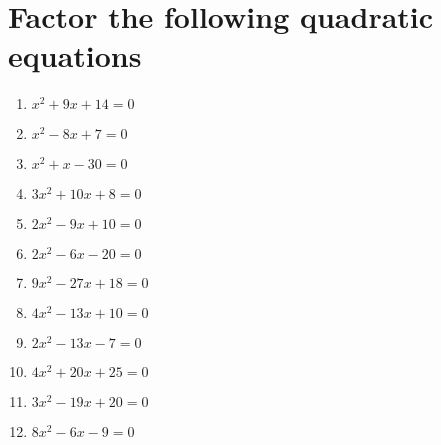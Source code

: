 \documentclass[12pt]{article}
\begin{document}
\section*{Factor the following quadratic equations}
\begin{minipage}[t]{0.45\textwidth}
    \begin{enumerate}[label=\#\arabic*]
        \setcounter{enumi}{0} %
        \item  $x^2+9x+14=0$
        \vspace{0.75em}
        \item  $x^2-8x+7=0$
        \vspace{0.75em}
        \item  $x^2+x-30=0$
        \vspace{0.75em}
        \item  $3x^2+10x+8=0$
        \vspace{0.75em}
        \item  $2x^2-9x+10=0$
        \vspace{0.75em}
        \item  $2x^2-6x-20=0$
        \end{enumerate}
\end{minipage}%
\hspace{1cm}
\begin{minipage}[t]{0.45\textwidth}
    \begin{enumerate}[label=\#\arabic*]
        \setcounter{enumi}{6} %
        \item  $9x^2-27x+18=0$
        \vspace{0.75em}
        \item  $4x^2-13x+10=0$
        \vspace{0.75em}
        \item  $2x^2-13x-7=0$
        \vspace{0.75em}
        \item  $4x^2+20x+25=0$
        \vspace{0.75em}
        \item  $3x^2-19x+20=0$
        \vspace{0.75em}
        \item  $8x^2-6x-9=0$

    \end{enumerate}
\end{minipage}

\begin{comment}
Notes:
- make ++ to ++, -- to +- table etc
- double check forms
- connect to zeros
- similar thing but a is not 1 as before
- show how graph is affected
- (x-m)(x-n) to (x+m)(x+n)
- backwards and expand to quadratic
- factor vs quadratic formula worksheet
\end{comment}
\end{document}
